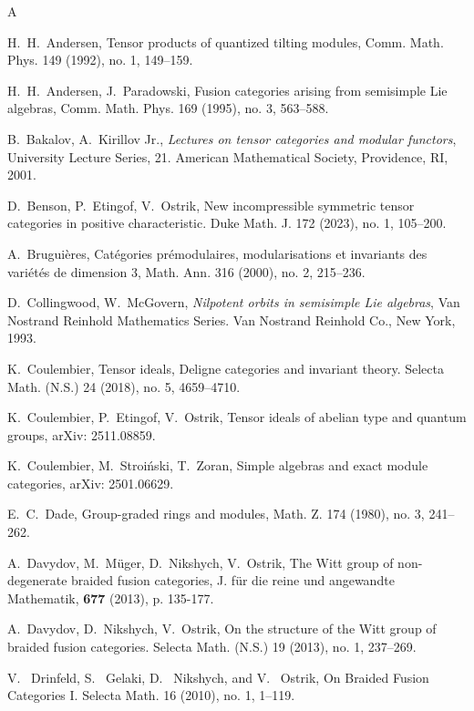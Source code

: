 \documentclass{amsart}
\theoremstyle{definition}
\numberwithin{equation}{section}
\begin{document}

\begin{thebibliography}{A}

 H.~H.~Andersen, Tensor products of quantized tilting modules, Comm. Math. Phys. 149 (1992), no. 1, 149--159.

 H.~H.~Andersen, J.~Paradowski, Fusion categories arising from semisimple Lie algebras, 
Comm. Math. Phys. 169 (1995), no. 3, 563--588.

 B.~Bakalov, A.~Kirillov Jr., \textit{Lectures on tensor categories and modular functors}, University Lecture Series, 21. American Mathematical Society, Providence, RI, 2001.

 D.~Benson, P.~Etingof, V.~Ostrik, New incompressible symmetric tensor categories in positive characteristic. Duke Math. J. 172 (2023), no. 1, 105--200. 

 A.~Brugui\`eres, Cat\'egories pr\'emodulaires, modularisations et invariants des vari\'et\'es de dimension 3, Math. Ann. 316 (2000), no. 2, 215--236.

 D.~Collingwood, W.~McGovern, \textit{Nilpotent orbits in semisimple Lie algebras}, Van Nostrand Reinhold Mathematics Series. Van Nostrand Reinhold Co., New York, 1993.

 K.~Coulembier, Tensor ideals, Deligne categories and invariant theory. Selecta Math. (N.S.) 24 (2018), no. 5, 4659--4710.

 K.~Coulembier, P.~Etingof, V.~Ostrik, Tensor ideals of abelian type and quantum groups,
arXiv: 2511.08859.

 K.~Coulembier, M.~Stroi\'nski, T.~Zoran, Simple algebras and exact module categories,
arXiv: 2501.06629.

 E.~C.~Dade, Group-graded rings and modules,
Math. Z. 174 (1980), no. 3, 241--262.

 A.~Davydov, M.~M\"uger, D.~Nikshych, V.~Ostrik, The Witt group of non-degenerate braided fusion categories, J. f\"ur die reine
und angewandte Mathematik, {\bf 677} (2013), p. 135-177.

 A.~Davydov, D.~Nikshych, V.~Ostrik, On the structure of the Witt group of braided fusion categories. Selecta Math. (N.S.) 19 (2013), no. 1, 237--269. 

 V. ~Drinfeld, S. ~Gelaki, D. ~Nikshych, and V. ~Ostrik,
 On Braided Fusion Categories I. Selecta Math. 16 (2010), no. 1, 1--119.


\end{thebibliography}
\end{document}

